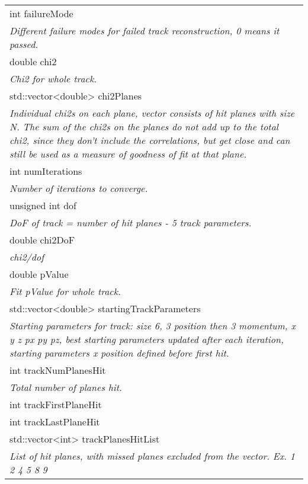 \begin{longtable}{|p{16cm}|}
int failureMode \\ 
\textit{Different failure modes for failed track reconstruction, 0 means it passed.} \\ \hline

double chi2 \\ 
\textit{Chi2 for whole track.} \\ \hline

std::vector\textless{}double\textgreater{} chi2Planes \\
\textit{Individual chi2s on each plane, vector consists of hit planes with size N. The sum of the chi2s on the planes do not add up to the total chi2, since they don't include the correlations, but get close and can still be used as a measure of goodness of fit at that plane.} \\ \hline

int numIterations \\
\textit{Number of iterations to converge.} \\ \hline

unsigned int dof \\
\textit{DoF of track = number of hit planes - 5 track parameters.} \\ \hline

double chi2DoF \\
\textit{chi2/dof} \\ \hline

double pValue \\
\textit{Fit pValue for whole track.} \\ \hline

std::vector\textless{}double\textgreater{} startingTrackParameters \\
\textit{Starting parameters for track: size 6, 3 position then 3 momentum, x y z px py pz, best starting parameters updated after each iteration, starting parameters x position defined before first hit.} \\ \hline

int trackNumPlanesHit \\ 
\textit{Total number of planes hit.} \\ \hline

int trackFirstPlaneHit \\ \hline

int trackLastPlaneHit \\ \hline

std::vector\textless{}int\textgreater{} trackPlanesHitList \\
\textit{List of hit planes, with missed planes excluded from the vector. Ex. 1 2 4 5 8 9} \\ \hline



\end{longtable}
